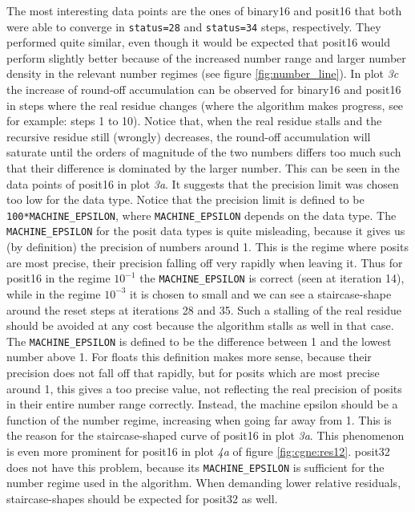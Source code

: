 \documentclass{article}
\theoremstyle{plain} %
\theoremstyle{convention} %
\theoremstyle{remark} %
\def\code#1{\texttt{#1}}
\numberwithin{equation}{section}
\begin{document}
The most interesting data points are the ones of \gls{binary16} and \gls{posit16} that both were able to converge in \code{status=28} and \code{status=34} steps, respectively. They performed quite similar, even though it would be expected that \gls{posit16} would perform slightly better because of the increased number range and larger number density in the relevant number regimes (see figure \ref{fig:number_line}). In plot \textit{3c} the increase of round-off accumulation can be observed for \gls{binary16} and \gls{posit16} in steps where the real residue changes (where the algorithm makes progress, see for example: steps \num{1} to \num{10}). Notice that, when the real residue stalls and the recursive residue still (wrongly) decreases, the round-off accumulation will saturate until the orders of magnitude of the two numbers differs too much such that their difference is dominated by the larger number. This can be seen in the data points of \gls{posit16} in plot \textit{3a}. It suggests that the precision limit was chosen too low for the data type. Notice that the precision limit is defined to be \code{100*MACHINE\_EPSILON}, where \code{MACHINE\_EPSILON} depends on the data type. The \code{MACHINE\_EPSILON} for the posit data types is quite misleading, because it gives us (by definition) the precision of numbers around \num{1}. This is the regime where posits are most precise, their precision falling off very rapidly when leaving it. Thus for \gls{posit16} in the regime $10^{-1}$ the \code{MACHINE\_EPSILON} is correct (seen at iteration \num{14}), while in the regime $10^{-3}$ it is chosen to small and we can see a staircase-shape around the reset steps at iterations \num{28} and \num{35}. Such a stalling of the real residue should be avoided at any cost because the algorithm stalls as well in that case. The \code{MACHINE\_EPSILON} is defined to be the difference between \num{1} and the lowest number above \num{1}. For floats this definition makes more sense, because their precision does not fall off that rapidly, but for posits which are most precise around \num{1}, this gives a too precise value, not reflecting the real precision of posits in their entire number range correctly. Instead, the machine epsilon should be a function of the number regime, increasing when going far away from \num{1}. This is the reason for the staircase-shaped curve of \gls{posit16} in plot \textit{3a}. This phenomenon is even more prominent for \gls{posit16} in plot \textit{4a} of figure \ref{fig:cgne:res12}. \Gls{posit32} does not have this problem, because its \code{MACHINE\_EPSILON} is sufficient for the number regime used in the algorithm. When demanding lower relative residuals, staircase-shapes should be expected for \gls{posit32} as well.
\end{document}
